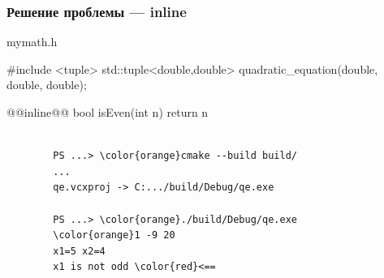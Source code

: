 \documentclass[9pt, aspectratio=1610]{beamer}
\begin{document}
\begin{frame}[fragile]\frametitle{Решение проблемы --- inline}
	
	\begin{block}{mymath.h}
		\begin{cppcode}
			#include <tuple>
			std::tuple<double,double> quadratic_equation(double, double, double);
			
			@@inline@@  bool isEven(int n) 
			{
				return n %
			}                     
		\end{cppcode}
	\end{block}
	
	
	\begin{Verbatim}[bgcolor=black,tabsize=4,formatcom=\color{white},gobble=2,fontsize=\small, commandchars=\\\{\}, xleftmargin=0em, frame=single,framerule=0pt ,rulecolor=\color{red},framesep=1em,fillcolor=\color{black}]
		
		PS ...> \color{orange}cmake --build build/
		...
		qe.vcxproj -> C:.../build/Debug/qe.exe
		
		PS ...> \color{orange}./build/Debug/qe.exe
		\color{orange}1 -9 20
		x1=5 x2=4
		x1 is not odd \color{red}<==
		
	\end{Verbatim}
	
	
\end{frame}
\end{document}
